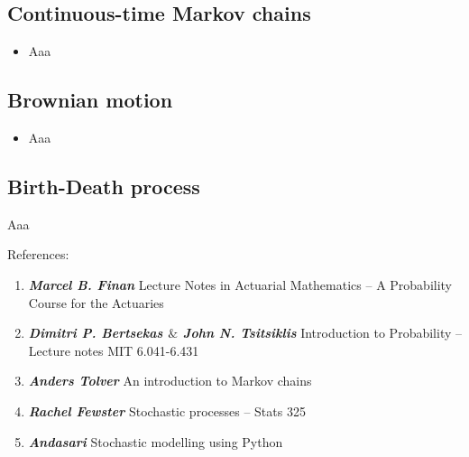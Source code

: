 \documentclass[12pt]{report}
\renewcommand{\_}{\kern-1.5pt\textunderscore\kern-1.5pt}
\begin{document}
\subsection*{Continuous-time Markov chains}
\begin{itemize}
	\item Aaa\par


\vspace{\baselineskip}

\end{itemize}\subsection*{Brownian motion}
\begin{itemize}
	\item Aaa\par


\vspace{\baselineskip}

\end{itemize}\subsection*{Birth-Death process}
	\item Aaa\par


\vspace{\baselineskip}

\vspace{\baselineskip}
References:\par

\begin{enumerate}
	\item \textbf{\textit{Marcel B. Finan}} Lecture Notes in Actuarial Mathematics – A Probability Course for the Actuaries\par

	\item \textbf{\textit{Dimitri P. Bertsekas $\&$  John N. Tsitsiklis}} Introduction to Probability – Lecture notes MIT 6.041-6.431\par

	\item \textbf{\textit{Anders Tolver}} An introduction to Markov chains\par

	\item \textbf{\textit{Rachel Fewster}} Stochastic processes – Stats 325\par

	\item \textbf{\textit{Andasari}} Stochastic modelling using Python
\end{enumerate}\par
\end{document}
